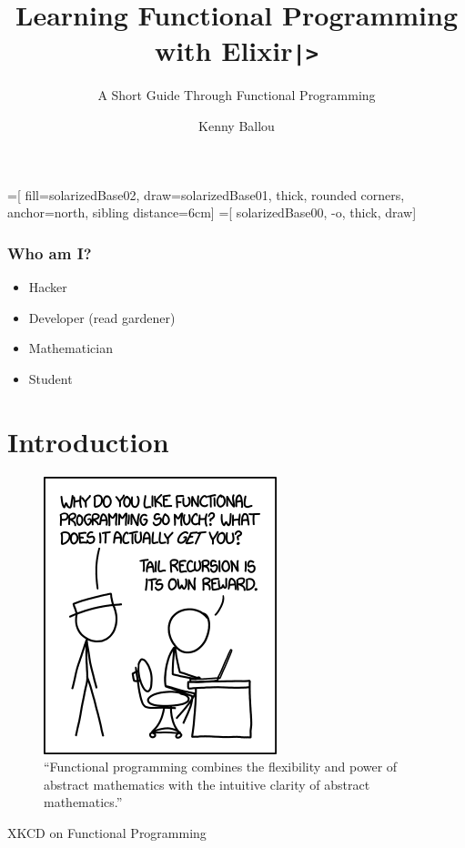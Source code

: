 \documentclass[english]{beamer}
\title{Learning Functional Programming with Elixir\texttt{|>}}
\subtitle{A Short Guide Through Functional Programming}
\author[Ballou]{Kenny Ballou}
\institute[zData]{%
    \inst{}%
    zData, Inc.
}
\begin{document}
=[%
    fill=solarizedBase02,
    draw=solarizedBase01,
    thick,
    rounded corners,
    anchor=north,
    sibling distance=6cm]
=[%
    solarizedBase00,
    -o,
    thick,
    draw]


\begin{frame}[label=titleslide]
\titlepage{}
\end{frame}

\begin{frame}
\tableofcontents[subsectionstyle=hide,subsubsectionstyle=hide]
\end{frame}

\begin{frame}
\frametitle{Who am I?}
\begin{itemize}
\item{Hacker}
\item{Developer (read gardener)}
\item{Mathematician}
\item{Student}
\end{itemize}

\end{frame}

\section{Introduction}

\begin{frame}
\begin{figure}
\includegraphics[scale=0.45]{xkcd_functional.png}
\caption{``Functional programming combines the flexibility and power of
abstract mathematics with the intuitive clarity of abstract mathematics.''}
\end{figure}
XKCD on Functional Programming\cite{website:xkcd_functional}
\end{frame}
\end{document}

